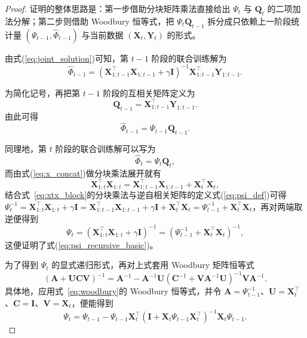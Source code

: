 \begin{proof}
证明的整体思路是：第一步借助分块矩阵乘法直接给出 $\Psi_t$ 与 $\mathbf{Q}_t$ 的二项加法分解；第二步则借助 Woodbury 恒等式，把 $\Psi_t\mathbf{Q}_{t-1}$ 拆分成只依赖上一阶段统计量 $(\Psi_{t-1},\widehat{\Phi}_{t-1})$ 与当前数据 $(\mathbf{X}_t,\mathbf{Y}_t)$ 的形式。

由式(\ref{eq:joint_solution})可知，第 $t-1$ 阶段的联合训练解为
\begin{equation}
\widehat{\Phi}_{t-1}=\left(\mathbf{X}_{1:t-1}^{\top}\mathbf{X}_{1:t-1}+\gamma\mathbf{I}\right)^{-1}\mathbf{X}_{1:t-1}^{\top}\mathbf{Y}_{1:t-1}.
\label{eq:phi_tminus1_joint}
\end{equation}

为简化记号，再把第 $t-1$ 阶段的互相关矩阵定义为
\begin{equation}
\mathbf{Q}_{t-1}=\mathbf{X}_{1:t-1}^{\top}\mathbf{Y}_{1:t-1}.
\label{eq:q_tminus1}
\end{equation}
由此可得
\begin{equation}
\widehat{\Phi}_{t-1}=\Psi_{t-1}\mathbf{Q}_{t-1}.
\label{eq:phi_as_psi_q}
\end{equation}

同理地，第 $t$ 阶段的联合训练解可以写为
\begin{equation}
\widehat{\Phi}_t=\Psi_t\mathbf{Q}_t,
\label{eq:phi_t_psi_q}
\end{equation}
而由式(\ref{eq:x_concat})做分块乘法展开就有
\begin{equation}
\mathbf{X}_{1:t}^{\top}\mathbf{X}_{1:t}=\mathbf{X}_{1:t-1}^{\top}\mathbf{X}_{1:t-1}+\mathbf{X}_t^{\top}\mathbf{X}_t,
\label{eq:xtx_block}
\end{equation}
结合式~\eqref{eq:xtx_block}的分块乘法与逆自相关矩阵的定义式(\ref{eq:psi_def})可得 $\Psi_t^{-1}=\mathbf{X}_{1:t}^{\top}\mathbf{X}_{1:t}+\gamma\mathbf{I}=\mathbf{X}_{1:t-1}^{\top}\mathbf{X}_{1:t-1}+\gamma\mathbf{I}+\mathbf{X}_t^{\top}\mathbf{X}_t=\Psi_{t-1}^{-1}+\mathbf{X}_t^{\top}\mathbf{X}_t$，再对两端取逆便得到
\begin{equation}
\Psi_t=\left(\mathbf{X}_{1:t}^{\top}\mathbf{X}_{1:t}+\gamma\mathbf{I}\right)^{-1}
=\left(\Psi_{t-1}^{-1}+\mathbf{X}_t^{\top}\mathbf{X}_t\right)^{-1},
\end{equation}
这便证明了式(\ref{eq:psi_recursive_basic})。

为了得到 $\Psi_t$ 的显式递归形式，再对上式套用 Woodbury 矩阵恒等式
\begin{equation}
(\mathbf{A}+\mathbf{U}\mathbf{C}\mathbf{V})^{-1}
=\mathbf{A}^{-1}-\mathbf{A}^{-1}\mathbf{U}\left(\mathbf{C}^{-1}+\mathbf{V}\mathbf{A}^{-1}\mathbf{U}\right)^{-1}\mathbf{V}\mathbf{A}^{-1}.
\label{eq:woodbury}
\end{equation}
具体地，应用式~\eqref{eq:woodbury}的 Woodbury 恒等式，并令 $\mathbf{A}=\Psi_{t-1}^{-1}$、$\mathbf{U}=\mathbf{X}_t^{\top}$、$\mathbf{C}=\mathbf{I}$、$\mathbf{V}=\mathbf{X}_t$，便能得到
\begin{equation}
\Psi_t=\Psi_{t-1}-\Psi_{t-1}\mathbf{X}_t^{\top}
\left(\mathbf{I}+\mathbf{X}_t\Psi_{t-1}\mathbf{X}_t^{\top}\right)^{-1}
\mathbf{X}_t\Psi_{t-1}.
\label{eq:psi_recursive_woodbury}
\end{equation}


\end{proof}
